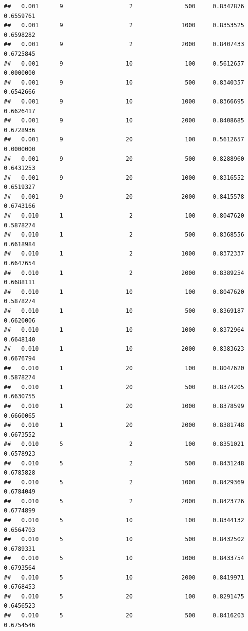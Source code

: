 \documentclass[]{article}
\begin{document}
\begin{lstlisting}
##   0.001      9                   2               500     0.8347876  0.6559761
##   0.001      9                   2              1000     0.8353525  0.6598282
##   0.001      9                   2              2000     0.8407433  0.6725845
##   0.001      9                  10               100     0.5612657  0.0000000
##   0.001      9                  10               500     0.8340357  0.6542666
##   0.001      9                  10              1000     0.8366695  0.6626417
##   0.001      9                  10              2000     0.8408685  0.6728936
##   0.001      9                  20               100     0.5612657  0.0000000
##   0.001      9                  20               500     0.8288960  0.6431253
##   0.001      9                  20              1000     0.8316552  0.6519327
##   0.001      9                  20              2000     0.8415578  0.6743166
##   0.010      1                   2               100     0.8047620  0.5878274
##   0.010      1                   2               500     0.8368556  0.6618984
##   0.010      1                   2              1000     0.8372337  0.6647654
##   0.010      1                   2              2000     0.8389254  0.6688111
##   0.010      1                  10               100     0.8047620  0.5878274
##   0.010      1                  10               500     0.8369187  0.6620006
##   0.010      1                  10              1000     0.8372964  0.6648140
##   0.010      1                  10              2000     0.8383623  0.6676794
##   0.010      1                  20               100     0.8047620  0.5878274
##   0.010      1                  20               500     0.8374205  0.6630755
##   0.010      1                  20              1000     0.8378599  0.6660065
##   0.010      1                  20              2000     0.8381748  0.6673552
##   0.010      5                   2               100     0.8351021  0.6578923
##   0.010      5                   2               500     0.8431248  0.6785828
##   0.010      5                   2              1000     0.8429369  0.6784049
##   0.010      5                   2              2000     0.8423726  0.6774899
##   0.010      5                  10               100     0.8344132  0.6564703
##   0.010      5                  10               500     0.8432502  0.6789331
##   0.010      5                  10              1000     0.8433754  0.6793564
##   0.010      5                  10              2000     0.8419971  0.6768453
##   0.010      5                  20               100     0.8291475  0.6456523
##   0.010      5                  20               500     0.8416203  0.6754546

\end{lstlisting}
\end{document}
